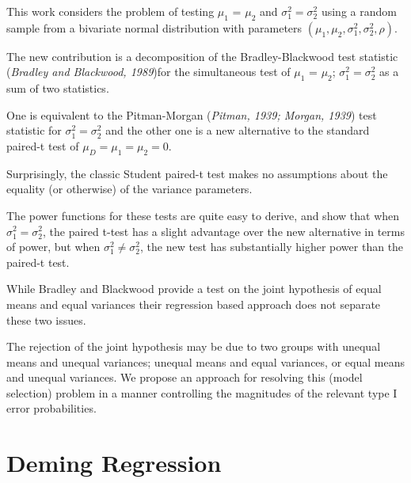 \documentclass[12pt, a4paper]{report}
\theoremstyle{plain}
\theoremstyle{definition}
\theoremstyle{remark}
\begin{document}
	This work considers the problem of testing $\mu_1$ = $\mu_2$ and $\sigma^2_1 = \sigma^2_2$ using a random sample from a bivariate normal distribution with parameters $(\mu_1, \mu_2, \sigma^2_1, \sigma^2_2, \rho)$. 
	
	The new contribution is a decomposition of the Bradley-Blackwood test statistic (\textit{Bradley and Blackwood, 1989})for the simultaneous test of {$\mu_1$ = $\mu_2$; $\sigma^2_1 = \sigma^2_2$}  as a sum of two statistics. 
	
	One is equivalent to the Pitman-Morgan (\textit{Pitman, 1939; Morgan, 1939}) test statistic 
	for $\sigma^2_1 = \sigma^2_2$ and the other one is a new alternative to the standard paired-t test of $\mu_D = \mu_1 = \mu_2 = 0$. 
	
	Surprisingly, the classic Student paired-t test makes no assumptions about the equality (or otherwise) of the 
	variance parameters. 
	
	The power functions for these tests are quite easy to derive, and show that when $\sigma^2_1 = \sigma^2_2$, 
	the paired t-test has a slight advantage over the new alternative in terms of power, but when $\sigma^2_1 \neq \sigma^2_2$, the 
	new test has substantially higher power than the paired-t test.
	
	While Bradley and Blackwood provide a test on the joint hypothesis of equal means and equal variances their regression based approach does not separate these two issues.
	
	The rejection of the joint hypothesis may be 
	due to two groups with unequal means and unequal variances; unequal means and equal variances, or equal means and unequal variances. We propose an approach for resolving this (model selection) problem in a manner controlling the magnitudes of the relevant type I error probabilities.
	
	
	
	
	\section*{Deming Regression}
	
\end{document}
